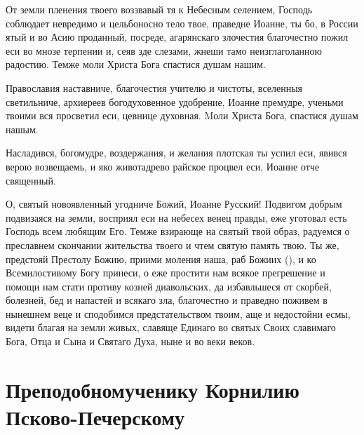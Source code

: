 \begin{mymulticols}



От земли пленения твоего воззвавый тя к Небесным селением, Господь соблюдает невредимо и цельбоносно тело твое, праведне Иоанне, ты бо, в России ятый и во Асию проданный, посреде, агарянскаго злочестия благочестно пожил еси во мнозе терпении и, сеяв зде слезами, жнеши тамо неизглаголанною радостию. Темже моли Христа Бога спастися душам нашим.




Православия наставниче, благочестия учителю и чистоты, вселенныя светильниче, архиереев  богодуховенное удобрение, Иоанне  премудре, ученьми твоими вся просветил еси, цевнице духовная. Mоли Христа Бога, спастися душам нашым.




Насладився, богомудре, воздержания, и желания плотская ты успил еси, явився верою возвещаемь, и яко животадрево райское процвел еси, Иоанне  отче священный.




О, святый новоявленный угодниче Божий, Иоанне Русский! Подвигом добрым подвизаяся на земли, восприял еси на небесех венец правды, еже уготовал есть Господь всем любящим Его. Темже взирающе на святый твой образ, радуемся о преславнем скончании жительства твоего и чтем святую память твою. Ты же, предстояй Престолу Божию, приими моления наша, раб Божиих (), и ко Всемилостивому Богу принеси, о еже простити нам всякое прегрешение и помощи нам стати противу козней диавольских, да избавльшеся от скорбей, болезней, бед и напастей и всякаго зла, благочестно и праведно поживем в нынешнем веце и сподобимся предстательством твоим, аще и недостойни есмы, видети благая на земли живых, славяще Единаго во святых Своих славимаго Бога, Отца и Сына и Святаго Духа, ныне и во веки веков.


\end{mymulticols}

\section{Преподобномученику Корнилию Псково-Печерскому}

\tolkopoblagosloveniyu

